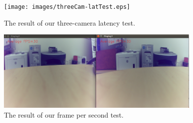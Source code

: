 \documentclass[letterpaper,10pt,serif,draftclsnofoot,onecolumn,compsoc,titlepage]{IEEEtran}
\begin{document}
\begin{figure}[H]
	\centering
	\label{fig:The result of our three-camera latency test.}
	\texttt{[image: images/threeCam-latTest.eps]}
	\caption{The result of our three-camera latency test. \label{overflow}}
\end{figure}

\begin{figure}[H]
	\centering
	\label{fig:The result of our frame per second test.}
	\includegraphics[width=10cm]{images/fps2.eps}
	\caption{The result of our frame per second test. \label{overflow}}
\end{figure}

%
%
\end{document}
